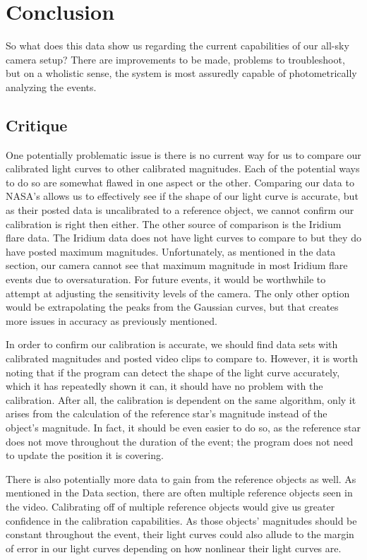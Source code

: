 \chapter{Conclusion}

So what does this data show us regarding the current capabilities of our all-sky camera setup? There are improvements to be made, problems to troubleshoot, but on a wholistic sense, the system is most assuredly capable of photometrically analyzing the events.

\section{Critique}
One potentially problematic issue is there is no current way for us to compare our calibrated light curves to other calibrated magnitudes. Each of the potential ways to do so are somewhat flawed in one aspect or the other. Comparing our data to NASA's allows us to effectively see if the shape of our light curve is accurate, but as their posted data is uncalibrated to a reference object, we cannot confirm our calibration is right then either. The other source of comparison is the Iridium flare data. The Iridium data does not have light curves to compare to but they do have posted maximum magnitudes. Unfortunately, as mentioned in the data section, our camera cannot see that maximum magnitude in most Iridium flare events due to oversaturation. For future events, it would be worthwhile to attempt at adjusting the sensitivity levels of the camera. The only other option would be extrapolating the peaks from the Gaussian curves, but that creates more issues in accuracy as previously mentioned.

In order to confirm our calibration is accurate, we should find data sets with calibrated magnitudes and posted video clips to compare to. However, it is worth noting that if the program can detect the shape of the light curve accurately, which it has repeatedly shown it can, it should have no problem with the calibration. After all, the calibration is dependent on the same algorithm, only it arises from the calculation of the reference star's magnitude instead of the object's magnitude. In fact, it should be even easier to do so, as the reference star does not move throughout the duration of the event; the program does not need to update the position it is covering. 

There is also potentially more data to gain from the reference objects as well. As mentioned in the Data section, there are often multiple reference objects seen in the video. Calibrating off of multiple reference objects would give us greater confidence in the calibration capabilities. As those objects' magnitudes should be constant throughout the event, their light curves could also allude to the margin of error in our light curves depending on how nonlinear their light curves are.

